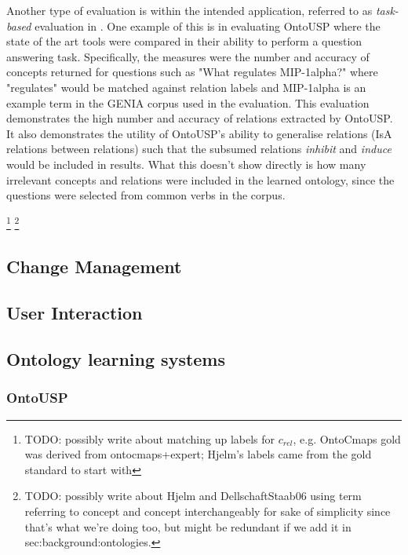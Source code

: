 \documentclass[a4paper]{report}
\newcommand{\todo}[1]{\footnote{{\color{red} TODO: #1}}}
\begin{document}
Another type of evaluation is within the intended application, referred to as \emph{task-based} evaluation in \cite{Wong11Survey}.
One example of this is in evaluating OntoUSP\cite{Poon2010OntoUSP} where the state of the art tools were compared in their ability to perform a question answering task.
Specifically, the measures were the number and accuracy of concepts returned for questions such as "What regulates MIP-1alpha?" where "regulates" would be matched against relation labels and MIP-1alpha is an example term in the GENIA corpus used in the evaluation.
This evaluation demonstrates the high number and accuracy of relations extracted by OntoUSP.
It also demonstrates the utility of OntoUSP's ability to generalise relations (IsA relations between relations) such that the subsumed relations \emph{inhibit} and \emph{induce} would be included in results.
What this doesn't show directly is how many irrelevant concepts and relations were included in the learned ontology, since the questions were selected from common verbs in the corpus\cite{Poon2010OntoUSP}.

\todo{possibly write about matching up labels for \(c_{rel}\), e.g. OntoCmaps gold was derived from ontocmaps+expert; Hjelm's labels came from the gold standard to start with}
\todo{possibly write about Hjelm and DellschaftStaab06 using term referring to concept and concept interchangeably for sake of simplicity since that's what we're doing too, but might be redundant if we add it in sec:background:ontologies.}

\subsection{Change Management}

\subsection{User Interaction}

\subsection{Ontology learning systems}

\subsubsection{OntoUSP}
\end{document}
